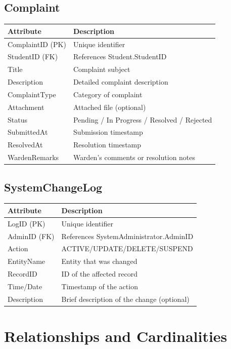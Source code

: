 \documentclass[12pt,a4paper]{article}
\begin{document}
\newpage
\subsection{Complaint}
\begin{longtable}{|p{4cm}|p{8cm}|}
\hline
\textbf{Attribute} & \textbf{Description} \\
\hline
ComplaintID (PK) & Unique identifier \\
StudentID (FK) & References Student.StudentID \\
Title & Complaint subject \\
Description & Detailed complaint description \\
ComplaintType & Category of complaint \\
Attachment & Attached file (optional) \\
Status & Pending / In Progress / Resolved / Rejected \\
SubmittedAt & Submission timestamp \\
ResolvedAt & Resolution timestamp \\
WardenRemarks & Warden's comments or resolution notes \\
\hline
\end{longtable}

\subsection{SystemChangeLog}
\begin{longtable}{|p{4cm}|p{8cm}|}
\hline
\textbf{Attribute} & \textbf{Description} \\
\hline
LogID (PK) & Unique identifier \\
AdminID (FK) & References SystemAdministrator.AdminID \\
Action & ACTIVE/UPDATE/DELETE/SUSPEND  \\
EntityName & Entity that was changed \\
RecordID & ID of the affected record \\
Time/Date & Timestamp of the action \\
Description & Brief description of the change (optional) \\
\hline
\end{longtable}

\newpage
\section{Relationships and Cardinalities}
\end{document}
